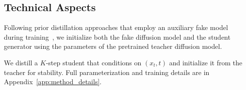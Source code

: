 \vspace{-1mm}
\subsection{Technical Aspects}
\label{sec:technical aspects}
\vspace{-1mm}
    Following prior distillation approaches that employ an auxiliary fake model during training~\citep{yin2024one, yin2024improved, zhou2024score, zhou2024adversarial, gushchin2025inverse, kornilov2025universal}, we initialize both the fake diffusion model and the student generator using the parameters of the pretrained teacher diffusion model.

    We distill a \(K\)-step student that conditions on \((x_t,t)\) and initialize it from the teacher for stability. Full parameterization and training details are in Appendix~\ref{app:method_details}.




